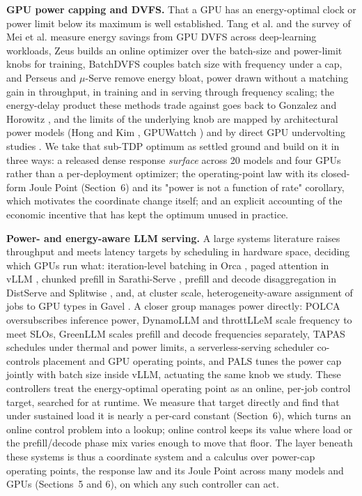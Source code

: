 \documentclass[3p,twocolumn]{elsarticle}
\begin{document}
\textbf{GPU power capping and DVFS.} That a GPU has an energy-optimal clock or power limit below its maximum
is well established. Tang et al. \cite{ref17} and the survey of Mei et al. \cite{ref18} measure energy savings from GPU DVFS
across deep-learning workloads, Zeus \cite{ref2} builds an online optimizer over the batch-size and power-limit knobs
for training, BatchDVFS \cite{ref21} couples batch size with frequency under a cap, and Perseus \cite{ref20} and
$\mu$-Serve \cite{ref22} remove energy bloat, power drawn without a matching gain in throughput, in training and in serving through frequency scaling; the energy-delay
product these methods trade against goes back to Gonzalez and Horowitz \cite{ref19}, and the limits of the underlying
knob are mapped by architectural power models (Hong and Kim \cite{ref38}, GPUWattch \cite{ref39}) and by direct GPU undervolting
studies \cite{ref40}. We take that sub-TDP optimum as settled ground and build on it in three ways: a released dense response \emph{surface} across 20
models and four GPUs rather than a per-deployment optimizer; the operating-point law with its closed-form Joule Point (Section~6) and its "power is not a function of rate" corollary, which motivates the coordinate
change itself; and an explicit accounting of the economic incentive that has kept the optimum unused in
practice.

\textbf{Power- and energy-aware LLM serving.} A large systems literature raises throughput and meets
latency targets by scheduling in hardware space, deciding which GPUs run what: iteration-level batching in Orca \cite{ref23}, paged attention in
vLLM \cite{ref24}, chunked prefill in Sarathi-Serve \cite{ref25}, prefill and decode disaggregation in DistServe \cite{ref26} and
Splitwise \cite{ref16}, and, at cluster scale, heterogeneity-aware assignment of jobs to GPU types in Gavel \cite{ref27}. A closer group manages power directly: POLCA
\cite{ref3} oversubscribes inference power, DynamoLLM \cite{ref4} and throttLL\textquotesingle eM \cite{ref45} scale frequency to meet SLOs, GreenLLM
\cite{ref46} scales prefill and decode frequencies separately, TAPAS \cite{ref47} schedules under thermal and power limits,
a serverless-serving scheduler \cite{ref44} co-controls placement and GPU operating points, and PALS \cite{ref43} tunes the
power cap jointly with batch size inside vLLM, actuating the same knob we study. These controllers treat the
energy-optimal operating point as an online, per-job control target, searched for at runtime. We measure that
target directly and find that under sustained load it is nearly a per-card constant (Section~6), which
turns an online control problem into a lookup; online control keeps
its value where load or the prefill/decode phase mix varies enough to move that floor. The layer beneath these
systems is thus a coordinate system and a calculus over power-cap operating points, the response law and its
Joule Point across many models and GPUs (Sections~5 and 6), on which any such controller can act.
\end{document}

